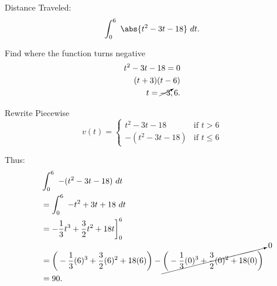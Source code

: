\documentclass{report}
\begin{document}
    Distance Traveled:
    \begin{align*}
        \int_{0}^{6}\ \abs{t^{2}-3t-18}\ dt
    .\end{align*}
    \bigbreak \noindent 
    
    Find where the function turns negative
    \begin{align*}
        t^{2} - 3t-18 = 0 \\
        (t+3)(t-6) \\
        t = \cancelto{}{-3}, 6
    .\end{align*}
    \bigbreak \noindent 
    
    Rewrite Piecewise
       \begin{equation}
        v(t)=
            \begin{cases}
                t^{2}-3t-18& \text{if } t > 6 \\
                 -(t^{2}-3t-18)& \text{if } t \leq 6 
            \end{cases}
        \end{equation}

        \pagebreak \bigbreak \noindent 
        Thus:
        \begin{align*}
            &\int_{0}^{6}\ -(t^{2}-3t-18)\ dt \\
            &=\int_{0}^{6}\ -t^{2}+3t+18\ dt \\
            &= -\frac{1}{3}t^{3}+\frac{3}{2}t^{2}+18t\bigg]^{6}_0 \\
            &= \bigg(-\frac{1}{3}(6)^{3}+\frac{3}{2}(6)^{2}+18(6)\bigg) - \cancelto{0}{\bigg(-\frac{1}{3}(0)^{3}+\frac{3}{2}(0)^{2}+18(0)\bigg)} \\
            &= 90
        .\end{align*}


    



    
    

    
    
\end{document}

